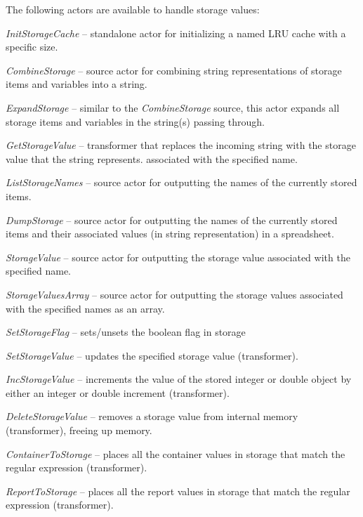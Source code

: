 The following actors are available to handle storage values:
\begin{tight_itemize}
	\item \textit{InitStorageCache} -- standalone actor for initializing a named
	LRU cache with a specific size.
	\item \textit{CombineStorage} -- source actor for combining string 
	representations of storage items and variables into a string.
	\item \textit{ExpandStorage} -- similar to the \textit{CombineStorage}
	source, this actor expands all storage items and variables in the string(s) 
	passing through.
	\item \textit{GetStorageValue} -- transformer that replaces the incoming 
	string with the storage value that the string represents.
	associated with the specified name.
	\item \textit{ListStorageNames} -- source actor for outputting the names of 
	the currently stored items.
	\item \textit{DumpStorage} -- source actor for outputting the names of
	the currently stored items and their associated values (in string
	representation) in a spreadsheet.
	\item \textit{StorageValue} -- source actor for outputting the storage value
	associated with the specified name.
	\item \textit{StorageValuesArray} -- source actor for outputting the 
	storage values associated with the specified names as an array.
	\item \textit{SetStorageFlag} -- sets/unsets the boolean flag in storage
	\item \textit{SetStorageValue} -- updates the specified storage value
	(transformer).
	\item \textit{IncStorageValue} -- increments the value of the stored integer or
	double object by either an integer or double increment (transformer).
	\item \textit{DeleteStorageValue} -- removes a storage value
	from internal memory (transformer), freeing up memory.
	\item \textit{ContainerToStorage} -- places all the container values in storage
	that match the regular expression (transformer).
	\item \textit{ReportToStorage} -- places all the report values in storage
	that match the regular expression (transformer).
\end{tight_itemize}


